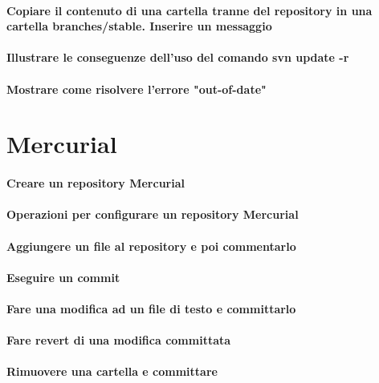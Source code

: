 \documentclass[a4paper]{article}
\begin{document}
	\paragraph{Copiare il contenuto di una cartella tranne del repository in una cartella branches/stable. Inserire un messaggio}

	\paragraph{Illustrare le conseguenze dell'uso del comando svn update -r}
	
	\paragraph{Mostrare come risolvere l'errore "out-of-date"}	
	

	
	\section{Mercurial} %
	
		\paragraph{Creare un repository Mercurial}
		
		\paragraph{Operazioni per configurare un repository Mercurial}
		
		\paragraph{Aggiungere un file al repository e poi commentarlo}	
		
		\paragraph{Eseguire un commit}
		
		\paragraph{Fare una modifica ad un file di testo e committarlo}
		
		\paragraph{Fare revert di una modifica committata}
		
		\paragraph{Rimuovere una cartella e committare}
		
		
	
\end{document}

